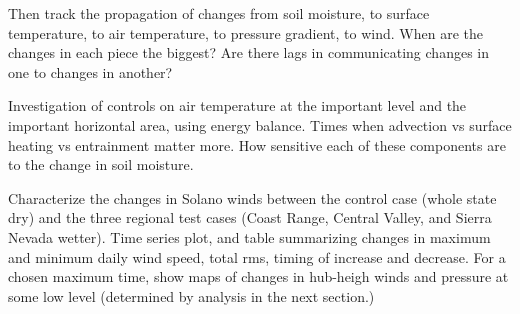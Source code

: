 \documentclass[12pt]{amsart}
\begin{document}
Then track the propagation of changes from soil moisture, to surface temperature, to air temperature, to pressure gradient, to wind.  When are the changes in each piece the biggest?  Are there lags in communicating changes in one to changes in another?

Investigation of controls on air temperature at the important level and the important horizontal area, using energy balance.  Times when advection vs surface heating vs entrainment matter more.  How sensitive each of these components are to the change in soil moisture.




Characterize the changes in Solano winds between the control case (whole state dry) and the three regional test cases (Coast Range, Central Valley, and Sierra Nevada wetter).  Time series plot, and table summarizing changes in maximum and minimum daily wind speed, total rms, timing of increase and decrease.  For a chosen maximum time, show maps of changes in hub-heigh winds and pressure at some low level (determined by analysis in the next section.)
\end{document}
